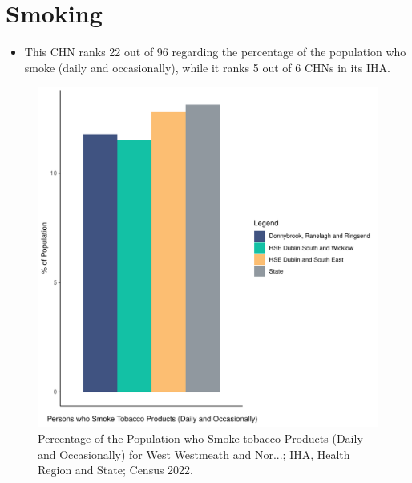 \documentclass{article}
\begin{document}
\pagebreak

\section{Smoking}\label{sect:Smoking}
\begin{itemize}
\item This CHN ranks  22 out of 96 regarding the percentage of the population who smoke (daily and occasionally), while it ranks   5 out of 6 CHNs in its IHA.
\end{itemize}
\begin{figure}[H]
	\centering
	\includegraphics[width = 120mm]{../figures/SmokingED.pdf}
	\caption{Percentage of the Population who Smoke tobacco Products (Daily and Occasionally) for West Westmeath and Nor...; IHA, Health Region and State; Census 2022.}
	\label{fig:2ae19629-1a6a-13a3-e055-000000000001}
	\end{figure}
	
\end{document}
